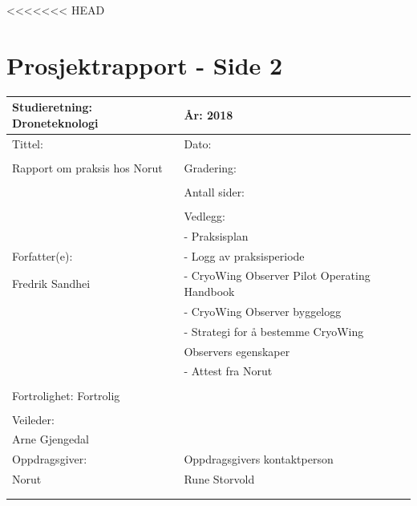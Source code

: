 \documentclass[12pt, a4paper]{article}
\begin{document}
\begin{titlepage}
\vfill %

\end{titlepage}
\date{\today}
<<<<<<< HEAD
\clearpage

\section*{Prosjektrapport - Side 2}

\begin{tabular}{ | l | l | }
	\hline
	\textbf{Studieretning: Droneteknologi}\hspace{1.7cm} & \textbf{År: 2018} \hspace{2cm} \\
	\hline 
	\hline
	Tittel: \hspace{5cm} 			& Dato: \\
						 			& \\
	Rapport om praksis hos Norut	& Gradering: \\
    								& \\
						 			& Antall sider: \\
						 			& \\
						 			& Vedlegg: \\ \cline{1-1}
						 			& - Praksisplan \\
	Forfatter(e):		     			& - Logg av praksisperiode \\
	Fredrik Sandhei		 			& - CryoWing Observer Pilot Operating Handbook \\
									& - CryoWing Observer byggelogg \\	
						 			& - Strategi for å bestemme CryoWing\\ 
						 			& Observers egenskaper \\ 
						 			& - Attest fra Norut\\
						 			& \\						 
	\hline
	Fortrolighet: Fortrolig		 	& \\						 			
						 			& \\
						 			\hline
	Veileder:			 			& \\ 
	Arne Gjengedal 					& \\
									\hline 
	Oppdragsgiver: 		 			& Oppdragsgivers kontaktperson \\
	Norut					 		& Rune Storvold \\
						 			& \\
						 			& \\
	\hline
\end{tabular}
\vspace{.25cm}
\end{document}
